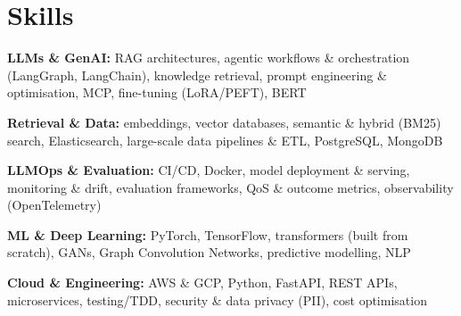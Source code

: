 \documentclass[10pt,a4paper]{article}
\begin{document}
\section{Skills}
\begin{tight}
  \item[\textcolor{accent}{\small$\bullet$}] \textbf{LLMs \& GenAI:} RAG architectures, agentic workflows \& orchestration (LangGraph, LangChain), knowledge retrieval, prompt engineering \& optimisation, MCP, fine-tuning (LoRA/PEFT), BERT
  \item[\textcolor{accent}{\small$\bullet$}] \textbf{Retrieval \& Data:} embeddings, vector databases, semantic \& hybrid (BM25) search, Elasticsearch, large-scale data pipelines \& ETL, PostgreSQL, MongoDB
  \item[\textcolor{accent}{\small$\bullet$}] \textbf{LLMOps \& Evaluation:} CI/CD, Docker, model deployment \& serving, monitoring \& drift, evaluation frameworks, QoS \& outcome metrics, observability (OpenTelemetry)
  \item[\textcolor{accent}{\small$\bullet$}] \textbf{ML \& Deep Learning:} PyTorch, TensorFlow, transformers (built from scratch), GANs, Graph Convolution Networks, predictive modelling, NLP
  \item[\textcolor{accent}{\small$\bullet$}] \textbf{Cloud \& Engineering:} AWS \& GCP, Python, FastAPI, REST APIs, microservices, testing/TDD, security \& data privacy (PII), cost optimisation
\end{tight}

\end{document}
